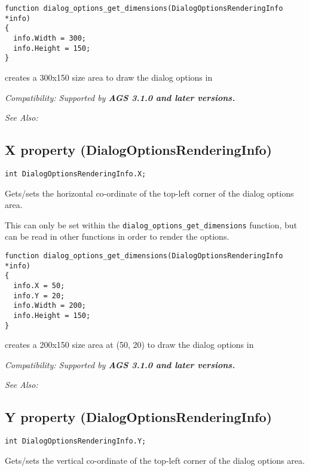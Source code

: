 \begin{verbatim}
function dialog_options_get_dimensions(DialogOptionsRenderingInfo *info)
{
  info.Width = 300;
  info.Height = 150;
}
\end{verbatim}
creates a 300x150 size area to draw the dialog options in

\it{Compatibility:} Supported by \bf{AGS 3.1.0} and later versions.

\it{See Also:} 


\subsection{X property (DialogOptionsRenderingInfo)}\label{DialogOptionsRenderingInfo.X}%

\begin{verbatim}
int DialogOptionsRenderingInfo.X;
\end{verbatim}
Gets/sets the horizontal co-ordinate of the top-left corner of the dialog options area.

This can only be set within the \verb$dialog_options_get_dimensions$ function, but
can be read in other functions in order to render the options.

\begin{verbatim}
function dialog_options_get_dimensions(DialogOptionsRenderingInfo *info)
{
  info.X = 50;
  info.Y = 20;
  info.Width = 200;
  info.Height = 150;
}
\end{verbatim}
creates a 200x150 size area at (50, 20) to draw the dialog options in

\it{Compatibility:} Supported by \bf{AGS 3.1.0} and later versions.

\it{See Also:} 


\subsection{Y property (DialogOptionsRenderingInfo)}\label{DialogOptionsRenderingInfo.Y}%

\begin{verbatim}
int DialogOptionsRenderingInfo.Y;
\end{verbatim}
Gets/sets the vertical co-ordinate of the top-left corner of the dialog options area.

